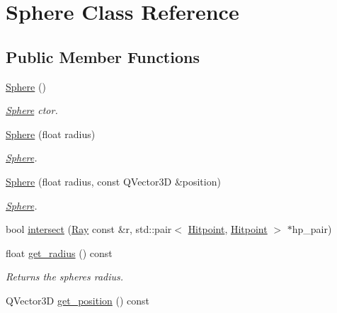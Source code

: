 \hypertarget{class_sphere}{}\section{Sphere Class Reference}
\label{class_sphere}
\subsection*{Public Member Functions}
\begin{DoxyCompactItemize}
\item 
\mbox{\label{class_sphere_a890a63ff583cb88e7ec4e840b4ef5eb9}} 
\mbox{\hyperlink{class_sphere_a890a63ff583cb88e7ec4e840b4ef5eb9}{Sphere}} ()
\begin{DoxyCompactList}\small\item\em \mbox{\hyperlink{class_sphere}{Sphere}} c\textquotesingle{}tor. \end{DoxyCompactList}\item 
\mbox{\label{class_sphere_a066dd77d24d95f7cb2e16880b3a5ae6e}} 
\mbox{\hyperlink{class_sphere_a066dd77d24d95f7cb2e16880b3a5ae6e}{Sphere}} (float radius)
\begin{DoxyCompactList}\small\item\em \mbox{\hyperlink{class_sphere}{Sphere}}. \end{DoxyCompactList}\item 
\mbox{\hyperlink{class_sphere_a507519d4ee1d48277626fe3c74e8228b}{Sphere}} (float radius, const Q\+Vector3D \&position)
\begin{DoxyCompactList}\small\item\em \mbox{\hyperlink{class_sphere}{Sphere}}. \end{DoxyCompactList}\item 
bool \mbox{\hyperlink{class_sphere_a789d83c264bed2ee64a30bca1261ab41}{intersect}} (\mbox{\hyperlink{struct_ray}{Ray}} const \&r, std\+::pair$<$ \mbox{\hyperlink{struct_hitpoint}{Hitpoint}}, \mbox{\hyperlink{struct_hitpoint}{Hitpoint}} $>$ $\ast$hp\+\_\+pair)
\item 
float \mbox{\hyperlink{class_sphere_ac22727cc5f7fdac7548798fb88f7cadd}{get\+\_\+radius}} () const
\begin{DoxyCompactList}\small\item\em Returns the spheres radius. \end{DoxyCompactList}\item 
Q\+Vector3D \mbox{\hyperlink{class_sphere_a253bd3ccf57e854989fb49c835fddb0b}{get\+\_\+position}} () const

\end{DoxyCompactItemize}
